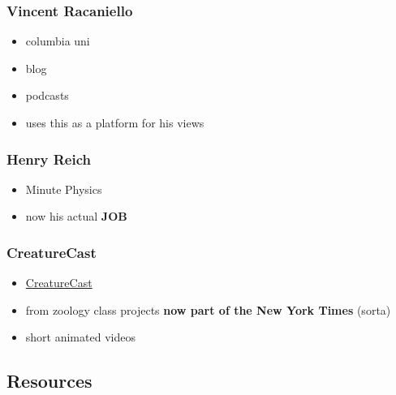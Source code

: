 \documentclass[letterpaper]{scrartcl}
\begin{document}
\subsubsection{Vincent Racaniello}\label{vincent-racaniello}

\begin{itemize}
\itemsep1pt\parskip0pt
\item
  columbia uni
\item
  blog
\item
  podcasts
\item
  uses this as a platform for his views
\end{itemize}

\subsubsection{Henry Reich}\label{henry-reich}

\begin{itemize}
\itemsep1pt\parskip0pt
\item
  Minute Physics
\item
  now his actual \textbf{JOB}
\end{itemize}

\subsubsection{CreatureCast}\label{creaturecast}

\begin{itemize}
\itemsep1pt\parskip0pt
\item
  \href{http://creaturecast.org}{CreatureCast}
\item
  from zoology class projects \textbf{now part of the New York Times}
  (sorta)
\item
  short animated videos
\end{itemize}

\subsection{Resources}\label{resources}
\end{document}
